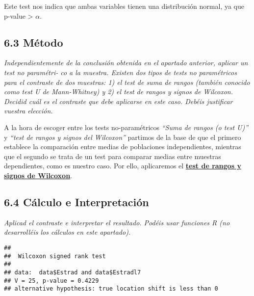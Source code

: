 \documentclass[
]{article}
\newenvironment{Shaded}{\begin{snugshade}}{\end{snugshade}}
\newcommand{\DataTypeTok}[1]{\textcolor[rgb]{0.13,0.29,0.53}{#1}}
\newcommand{\FloatTok}[1]{\textcolor[rgb]{0.00,0.00,0.81}{#1}}
\newcommand{\KeywordTok}[1]{\textcolor[rgb]{0.13,0.29,0.53}{\textbf{#1}}}
\newcommand{\NormalTok}[1]{#1}
\newcommand{\OperatorTok}[1]{\textcolor[rgb]{0.81,0.36,0.00}{\textbf{#1}}}
\newcommand{\OtherTok}[1]{\textcolor[rgb]{0.56,0.35,0.01}{#1}}
\newcommand{\StringTok}[1]{\textcolor[rgb]{0.31,0.60,0.02}{#1}}
\begin{document}
Este test nos indica que ambas variables tienen una distribución normal,
ya que p-value \textgreater{} \(\alpha\).

\hypertarget{muxe9todo-3}{%
\subsection{6.3 Método}\label{muxe9todo-3}}

\emph{Independientemente de la conclusión obtenida en el apartado
anterior, aplicar un test no paramétri- co a la muestra. Existen dos
tipos de tests no paramétricos para el contraste de dos muestras: 1) el
test de suma de rangos (también conocido como test U de Mann-Whitney) y
2) el test de rangos y signos de Wilcoxon. Decidid cuál es el contraste
que debe aplicarse en este caso. Debéis justificar vuestra elección. }

A la hora de escoger entre los tests no-paramétricos \emph{``Suma de
rangos (o test U)''} y \emph{``test de rangos y signos del Wilcoxon''}
partimos de la base de que el primero establece la comparación entre
medias de poblaciones independientes, mientras que el segundo se trata
de un test para comparar medias entre muestras dependientes, como es
nuestro caso. Por ello, aplicaremos el
\href{https://www.r-bloggers.com/wilcoxon-signed-rank-test/}{\textbf{test
de rangos y signos de Wilcoxon}}.

\hypertarget{cuxe1lculo-e-interpretaciuxf3n}{%
\subsection{6.4 Cálculo e
Interpretación}\label{cuxe1lculo-e-interpretaciuxf3n}}

\emph{Aplicad el contraste e interpretar el resultado. Podéis usar
funciones R (no desarrolléis los cálculos en este apartado).}

\begin{Shaded}
\end{Shaded}

\begin{verbatim}
## 
##  Wilcoxon signed rank test
## 
## data:  data$Estrad and data$Estradl7
## V = 25, p-value = 0.4229
## alternative hypothesis: true location shift is less than 0
\end{verbatim}
\end{document}
